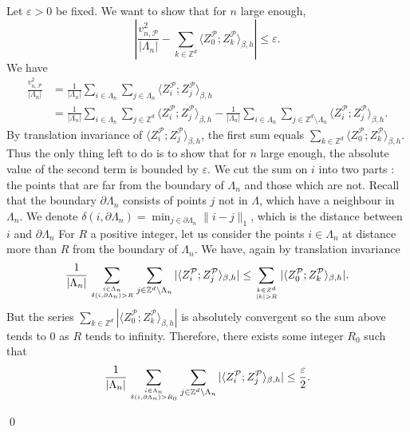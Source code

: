 \documentclass{amsart}
\newcommand{\field}[1]{\mathbb{#1}}
\newcommand{\Z}{\field{Z}}
\def\eps{\varepsilon}
\numberwithin{equation}{section}
\theoremstyle{remark}
\renewenvironment{proof}[1][Proof]{\begin{trivlist}
\item[\hskip \labelsep {\bfseries #1:}]}{\qed\end{trivlist}}
\begin{document}
\begin{proof}
Let $\eps >0$ be fixed. We want to show that for $n$ large enough,
$$\left| \frac{v_{n,\mathcal{P}}^2}{|\Lambda_n|} - \sum_{k \in \Z^d} \langle Z_0^{\mathcal{P}} ; Z_k^{\mathcal{P}} \rangle_{\beta,h} \right| \leq \eps.$$
We have
\begin{align*}
\frac{v_{n,\mathcal{P}}^2}{|\Lambda_n|} &= \frac{1}{|\Lambda_n|} \sum_{i \in \Lambda_n} \sum_{j \in \Lambda_n} \langle Z_i^{\mathcal{P}} ; Z_j^{\mathcal{P}} \rangle_{\beta,h}
\\&= \frac{1}{|\Lambda_n|} \sum_{i \in \Lambda_n} \sum_{j \in \Z^d} \langle Z_i^{\mathcal{P}} ; Z_j^{\mathcal{P}}\rangle_{\beta,h} - \frac{1}{|\Lambda_n|} \sum_{i \in \Lambda_n} \sum_{j \in \Z^d \setminus \Lambda_n} \langle Z_i^{\mathcal{P}} ; Z_j^{\mathcal{P}} \rangle_{\beta,h}.
\end{align*}
By translation invariance of $\langle Z_i^{\mathcal{P}} ; Z_j^{\mathcal{P}} \rangle_{\beta,h}$, the first sum equals $\sum_{k \in \Z^d} \langle Z_0^{\mathcal{P}} ; Z_k^{\mathcal{P}} \rangle_{\beta,h}$.
Thus the only thing left to do is to show that for $n$ large enough, the absolute value of the second term is bounded by $\eps$.
We cut the sum on $i$ into two parts : the points that are far from the boundary of $\Lambda_n$ and those which are not.
Recall that the boundary $\partial \Lambda_n$ consists of points $j$ not in $\Lambda$,
which have a neighbour in $\Lambda_n$.
We denote $\delta(i,\partial \Lambda_n)=\min_{j \in \partial \Lambda_n} \parallel i-j \parallel_1$,
which is the distance between $i$ and $\partial \Lambda_n$
For $R$ a positive integer,
let us consider the points $i \in \Lambda_n$ at distance more than $R$ from the boundary of $\Lambda_n$.
We have, again by translation invariance
$$\frac{1}{|\Lambda_n|} \sum_{i \in \Lambda_n \atop \delta(i, \partial \Lambda_n) >R} \sum_{j \in \Z^d \setminus \Lambda_n} |\langle Z_i^{\mathcal{P}} ; Z_j^{\mathcal{P}} \rangle_{\beta,h}| \leq \sum_{k \in Z^d \atop |k| > R}  |\langle Z_0^{\mathcal{P}} ; Z_k^{\mathcal{P}} \rangle_{\beta,h}|.$$
But the series $\sum_{k \in \Z^d} |\langle Z_0^{\mathcal{P}} ; Z_k^{\mathcal{P}} \rangle_{\beta,h}|$ is absolutely convergent so the sum above tends to $0$ as $R$ tends to infinity. Therefore, there exists some integer $R_0$ such that
\begin{equation}
\label{eq:premierepsilon}
\frac{1}{|\Lambda_n|} \sum_{i \in \Lambda_n \atop \delta(i, \partial \Lambda_n) >R_0} \sum_{j \in \Z^d \setminus \Lambda_n} |\langle Z_i^{\mathcal{P}} ; Z_j^{\mathcal{P}} \rangle_{\beta,h}| \leq \frac{\eps}{2}.
\end{equation}


\end{proof}
\end{document}
